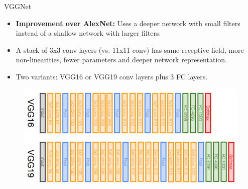 \begin{frame}{VGGNet}
\begin{itemize}
    \item \textbf{Improvement over AlexNet:} Uses a deeper network with small filters instead of a shallow network with larger filters.
    \item A stack of 3x3 conv layers (vs. 11x11 conv) has same receptive field, more non-linearities, fewer parameters and deeper network representation.
    \item Two variants: VGG16 or VGG19 conv layers plus 3 FC layers.
\end{itemize}

\begin{figure}
\centering
\includegraphics[width=1.0\textwidth,height=0.5\textheight,keepaspectratio]{./images/VGG_16_19.png}
\end{figure}
    
\end{frame}

